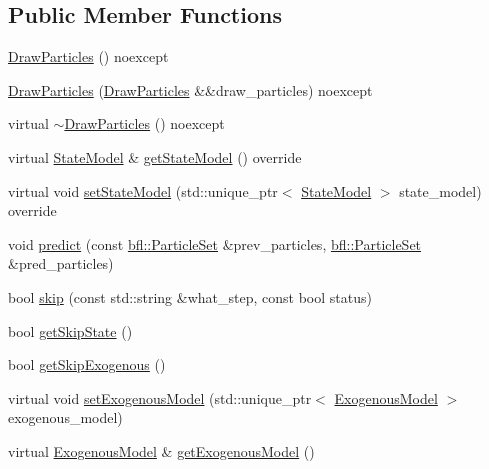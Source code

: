 \subsection*{Public Member Functions}
\begin{DoxyCompactItemize}
\item 
\mbox{\hyperlink{classbfl_1_1DrawParticles_acd7269927dc19bf3f34f7a65934c1e2c}{Draw\+Particles}} () noexcept
\item 
\mbox{\hyperlink{classbfl_1_1DrawParticles_aa5ef8dc20a4c5fac0f30531fbe5a1ecd}{Draw\+Particles}} (\mbox{\hyperlink{classbfl_1_1DrawParticles}{Draw\+Particles}} \&\&draw\+\_\+particles) noexcept
\item 
virtual \mbox{\hyperlink{classbfl_1_1DrawParticles_a7acfdc073d85f1425c2d8d9ba1339896}{$\sim$\+Draw\+Particles}} () noexcept
\item 
virtual \mbox{\hyperlink{classbfl_1_1StateModel}{State\+Model}} \& \mbox{\hyperlink{classbfl_1_1DrawParticles_a7a7ebf5a7ea10747db1bd8ab03390107}{get\+State\+Model}} () override
\item 
virtual void \mbox{\hyperlink{classbfl_1_1DrawParticles_acb607ab90c22a43a72a75576acb898a4}{set\+State\+Model}} (std\+::unique\+\_\+ptr$<$ \mbox{\hyperlink{classbfl_1_1StateModel}{State\+Model}} $>$ state\+\_\+model) override
\item 
void \mbox{\hyperlink{classbfl_1_1PFPrediction_a129dcd1cccd2da9827ef0c49c90b9345}{predict}} (const \mbox{\hyperlink{classbfl_1_1ParticleSet}{bfl\+::\+Particle\+Set}} \&prev\+\_\+particles, \mbox{\hyperlink{classbfl_1_1ParticleSet}{bfl\+::\+Particle\+Set}} \&pred\+\_\+particles)
\item 
bool \mbox{\hyperlink{classbfl_1_1PFPrediction_a364cc35a151e5298c4024d681f3e04d9}{skip}} (const std\+::string \&what\+\_\+step, const bool status)
\item 
bool \mbox{\hyperlink{classbfl_1_1PFPrediction_a323ca5612dd7ad924fd448a629359ad2}{get\+Skip\+State}} ()
\item 
bool \mbox{\hyperlink{classbfl_1_1PFPrediction_a432b8e84dbf00432158aa82312386d63}{get\+Skip\+Exogenous}} ()
\item 
virtual void \mbox{\hyperlink{classbfl_1_1PFPrediction_ada843698204584e97d4ff6728c8e8264}{set\+Exogenous\+Model}} (std\+::unique\+\_\+ptr$<$ \mbox{\hyperlink{classbfl_1_1ExogenousModel}{Exogenous\+Model}} $>$ exogenous\+\_\+model)
\item 
virtual \mbox{\hyperlink{classbfl_1_1ExogenousModel}{Exogenous\+Model}} \& \mbox{\hyperlink{classbfl_1_1PFPrediction_aefa127a440649447e8ac659ef65b7a2a}{get\+Exogenous\+Model}} ()
\end{DoxyCompactItemize}
